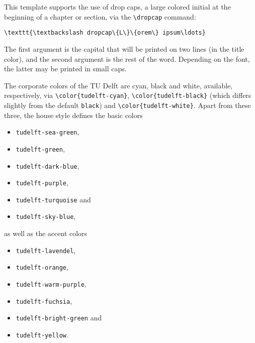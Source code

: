 This template supports the use of drop caps, a large colored initial at the beginning of a chapter or section, via the \verb|\dropcap| command:

\begin{verbatim}
\texttt{\textbackslash dropcap\{L\}\{orem\} ipsum\ldots}
\end{verbatim}
The first argument is the capital that will be printed on two lines (in the title color), and the second argument is the rest of the word. Depending on the font, the latter may be printed in small caps.

The corporate colors of the TU Delft are cyan, black and white, available, respectively, via \texttt{\textbackslash color\{{\color{tudelft-cyan}tudelft-cyan}\}}, \texttt{\textbackslash color\{{\color{tudelft-black}tudelft-black}\}} (which differs slightly from the default \texttt{black}) and \texttt{\textbackslash color\{tudelft-white\}}. Apart from these three, the house style defines the basic colors
\begin{itemize}
\itemsep 0pt
\parskip 0pt
\item\texttt{\color{tudelft-sea-green}tudelft-sea-green},
\item\texttt{\color{tudelft-green}tudelft-green},
\item\texttt{\color{tudelft-dark-blue}tudelft-dark-blue},
\item\texttt{\color{tudelft-purple}tudelft-purple},
\item\texttt{\color{tudelft-turquoise}tudelft-turquoise} and
\item\texttt{\color{tudelft-sky-blue}tudelft-sky-blue},
\end{itemize}
as well as the accent colors
\begin{itemize}
\itemsep 0pt
\parskip 0pt
\item\texttt{\color{tudelft-lavendel}tudelft-lavendel},
\item\texttt{\color{tudelft-orange}tudelft-orange},
\item\texttt{\color{tudelft-warm-purple}tudelft-warm-purple},
\item\texttt{\color{tudelft-fuchsia}tudelft-fuchsia},
\item\texttt{\color{tudelft-bright-green}tudelft-bright-green} and
\item\texttt{\color{tudelft-yellow}tudelft-yellow}.
\end{itemize}

\printbibliography

